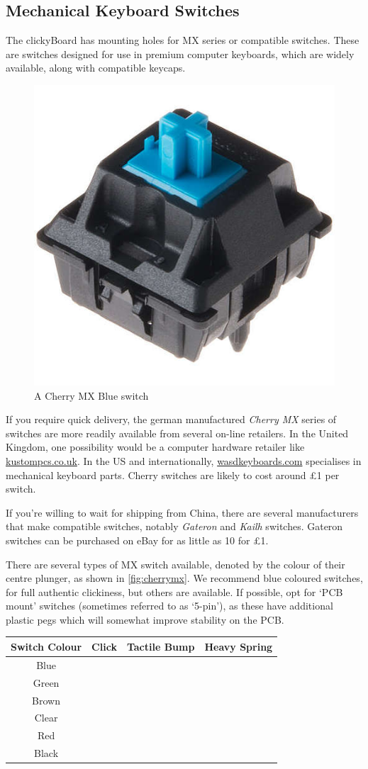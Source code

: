 \documentclass[10pt, a4paper, onesided]{article}
\begin{document}
	\subsection{Mechanical Keyboard Switches}
	
	The clickyBoard has mounting holes for MX series or compatible switches. These are switches designed for use in premium computer keyboards, which are widely available, along with compatible keycaps.
	
	\begin{figure}[h]
		\centering
		\includegraphics[width=0.25\linewidth]{img/cherrymx}
		\caption{A Cherry MX Blue switch}
		\label{fig:cherrymx}
	\end{figure}
	
	If you require quick delivery, the german manufactured \textit{Cherry MX} series of switches are more readily available from several on-line retailers. In the United Kingdom, one possibility would be a computer hardware retailer like \href{http://www.kustompcs.co.uk/acatalog/Keys_and_Accessories.html}{kustompcs.co.uk}. In the US and internationally, \href{http://www.wasdkeyboards.com/index.php/products/keyboard-parts.html}{wasdkeyboards.com} specialises in mechanical keyboard parts. Cherry switches are likely to cost around \pounds1 per switch.
	
	If you're willing to wait for shipping from China, there are several manufacturers that make compatible switches, notably \textit{Gateron} and \textit{Kailh} switches. Gateron switches can be purchased on eBay for as little as 10 for \pounds1.
	
	There are several types of MX switch available, denoted by the colour of their centre plunger, as shown in \autoref*{fig:cherrymx}. We recommend blue coloured switches, for full authentic clickiness, but others are available. If possible, opt for `PCB mount' switches (sometimes referred to as `5-pin'), as these have additional plastic pegs which will somewhat improve stability on the PCB.
	
	\begin{center}
	\begin{tabular}{c|c|c|c}
		Switch Colour & Click & Tactile Bump & Heavy Spring \\ 
		\hline 
		Blue & \checkmark & \checkmark & \\ 
		Green & \checkmark & \checkmark & \checkmark \\ 
		Brown &  & \checkmark & \\ 
		Clear &  & \checkmark & \checkmark \\ 
		Red &  &  & \\ 
		Black &  &  & \checkmark \\ 
	\end{tabular}
	\end{center}
\end{document}
